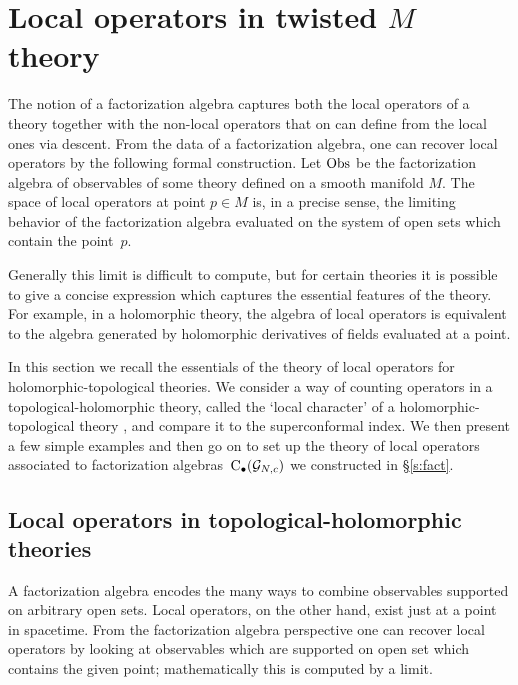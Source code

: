 %
%
%

\section{Local operators in twisted $M$ theory}

The notion of a factorization algebra captures both the local operators of a theory together with the non-local operators that on can define from the local ones via descent.
From the data of a factorization algebra, one can recover local operators by the following formal construction. 
Let $\operatorname{Obs}$ be the factorization algebra of observables of some theory defined on a smooth manifold $M$.
The space of local operators at point $p \in M$ is, in a precise sense, the limiting behavior of the factorization algebra evaluated on the system of open sets which contain the point~$p$. 

Generally this limit is difficult to compute, but for certain theories it is possible to give a concise expression which captures the essential features of the theory.
For example, in a holomorphic theory, the algebra of local operators is equivalent to the algebra generated by holomorphic derivatives of fields evaluated at a point.

In this section we recall the essentials of the theory of local operators for holomorphic-topological theories. 
We consider a way of counting operators in a topological-holomorphic theory, called the `local character' of a holomorphic-topological theory \cite{SWchar}, and compare it to the superconformal index.
We then present a few simple examples and then go on to set up the theory of local operators associated to factorization algebras~${\rm C}_\bullet(\mathcal G_{N,c})$ we constructed in \S \ref{s:fact}.

\subsection{Local operators in topological-holomorphic theories}

A factorization algebra encodes the many ways to combine observables supported on arbitrary open sets. 
Local operators, on the other hand, exist just at a point in spacetime.
From the factorization algebra perspective one can recover local operators by looking at observables which are supported on  open set which contains the given point; mathematically this is computed by a limit. 

